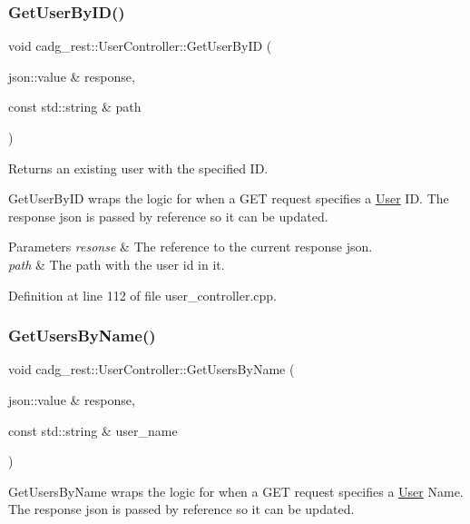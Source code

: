 \subsubsection{\texorpdfstring{GetUserByID()}{GetUserByID()}}
{\footnotesize\ttfamily void cadg\+\_\+rest\+::\+User\+Controller\+::\+Get\+User\+By\+ID (\begin{DoxyParamCaption}\item[{json\+::value \&}]{response,  }\item[{const std\+::string \&}]{path }\end{DoxyParamCaption})}



Returns an existing user with the specified ID. 

Get\+User\+By\+ID wraps the logic for when a G\+ET request specifies a \mbox{\hyperlink{structcadg__rest_1_1_user}{User}} ID. The response json is passed by reference so it can be updated.


\begin{DoxyParams}{Parameters}
{\em resonse} & The reference to the current response json. \\
\hline
{\em path} & The path with the user id in it. \\
\hline
\end{DoxyParams}


Definition at line 112 of file user\+\_\+controller.\+cpp.

\mbox{\label{classcadg__rest_1_1_user_controller_aa98afe262762a47ff443a36eb4a97b8d}} 
\subsubsection{\texorpdfstring{GetUsersByName()}{GetUsersByName()}}
{\footnotesize\ttfamily void cadg\+\_\+rest\+::\+User\+Controller\+::\+Get\+Users\+By\+Name (\begin{DoxyParamCaption}\item[{json\+::value \&}]{response,  }\item[{const std\+::string \&}]{user\+\_\+name }\end{DoxyParamCaption})}

Get\+Users\+By\+Name wraps the logic for when a G\+ET request specifies a \mbox{\hyperlink{structcadg__rest_1_1_user}{User}} Name. The response json is passed by reference so it can be updated.


